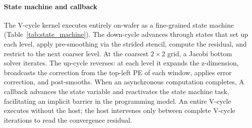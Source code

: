 \documentclass[conference]{IEEEtran}
\begin{document}
            \paragraph{State machine and callback}
                The V-cycle kernel %
                executes entirely on-wafer as a %
                fine-grained state machine (Table~\ref{tab:state_machine}). The down-cycle advances through states that set up each level, apply pre-smoothing via the strided stencil, 
                compute the residual, %
                and restrict to the next coarser level. %
                At the coarsest $2\times2$ grid, a Jacobi bottom solver iterates. The up-cycle reverses: at each level it expands the z-dimension,
                broadcasts the correction from the top-left PE of each window, %
                applies error correction, %
                and post-smooths. 
                When an asynchronous computation %
                completes, %
                A callback advances the state variable and reactivates the state machine task, facilitating an implicit barrier in the programming model. %
                An entire V-cycle executes without %
                the host; the host intervenes only between complete V-cycle iterations to read the convergence residual. %

            
\end{document}
